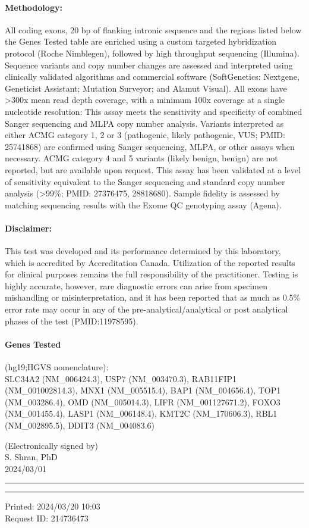 \documentclass[9pt]{extarticle}
\begin{document}
\paragraph{Methodology:} All coding exons, 20 bp of flanking intronic sequence and the regions listed below the Genes Tested table are enriched using a custom targeted hybridization protocol (Roche Nimblegen), followed by high throughput sequencing (Illumina). Sequence variants and copy number changes are assessed and interpreted using clinically validated algorithms and commercial software (SoftGenetics: Nextgene, Geneticist Assistant; Mutation Surveyor; and Alamut Visual). All exons have >300x mean read depth coverage, with a minimum 100x coverage at a single nucleotide resolution: This assay meets the sensitivity and specificity of combined Sanger sequencing and MLPA copy number analysis. Variants interpreted as either ACMG category 1, 2 or 3 (pathogenic, likely pathogenic, VUS; PMID: 25741868) are confirmed using Sanger sequencing, MLPA, or other assays when necessary. ACMG category 4 and 5 variants (likely benign, benign) are not reported, but are available upon request. This assay has been validated at a level of sensitivity equivalent to the Sanger sequencing and standard copy number analysis (>99\%; PMID: 27376475, 28818680). Sample fidelity is assessed by matching sequencing results with the Exome QC genotyping assay (Agena).

\paragraph{Disclaimer:} This test was developed and its performance determined by this laboratory, which is accredited by Accreditation Canada. Utilization of the reported results for clinical purposes remains the full responsibility of the practitioner. Testing is highly accurate, however, rare diagnostic errors can arise from specimen mishandling or misinterpretation, and it has been reported that as much as 0.5\% error rate may occur in any of the pre-analytical/analytical or post analytical phases of the test (PMID:11978595).

\paragraph{Genes Tested} (hg19;HGVS nomenclature): \\
SLC34A2 (NM\_006424.3), USP7 (NM\_003470.3), RAB11FIP1 (NM\_001002814.3), MNX1 (NM\_005515.4), BAP1 (NM\_004656.4), TOP1 (NM\_003286.4), OMD (NM\_005014.3), LIFR (NM\_001127671.2), FOXO3 (NM\_001455.4), LASP1 (NM\_006148.4), KMT2C (NM\_170606.3), RBL1 (NM\_002895.5), DDIT3 (NM\_004083.6)

\vspace{1em}

(Electronically signed by) \\
S. Shran, PhD \\
2024/03/01

\vspace{1em}
\hrule
\vspace{1pt}
\hrule
\vspace{1em}

Printed: 2024/03/20 10:03\\
Request ID: 214736473
\end{document}
